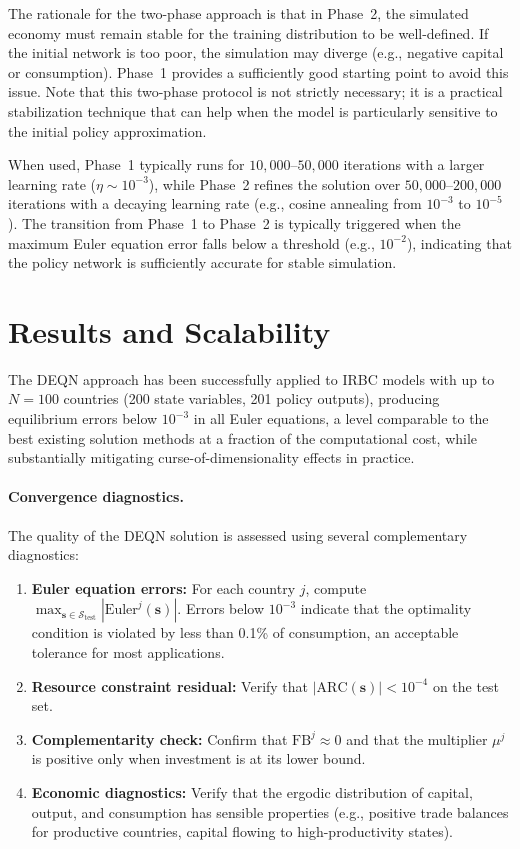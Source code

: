 \documentclass[11pt,a4paper]{report}
\begin{document}
The rationale for the two-phase approach is that in Phase~2, the simulated economy must remain stable for the training distribution to be well-defined.  If the initial network is too poor, the simulation may diverge (e.g., negative capital or consumption).  Phase~1 provides a sufficiently good starting point to avoid this issue.  Note that this two-phase protocol is not strictly necessary; it is a practical stabilization technique that can help when the model is particularly sensitive to the initial policy approximation.

When used, Phase~1 typically runs for $10{,}000$--$50{,}000$ iterations with a larger learning rate ($\eta \sim 10^{-3}$), while Phase~2 refines the solution over $50{,}000$--$200{,}000$ iterations with a decaying learning rate (e.g., cosine annealing from $10^{-3}$ to $10^{-5}$).  The transition from Phase~1 to Phase~2 is typically triggered when the maximum Euler equation error falls below a threshold (e.g., $10^{-2}$), indicating that the policy network is sufficiently accurate for stable simulation.

\section{Results and Scalability}

The DEQN approach has been successfully applied to IRBC models with up to $N=100$ countries (200 state variables, 201 policy outputs), producing equilibrium errors below $10^{-3}$ in all Euler equations, a level comparable to the best existing solution methods at a fraction of the computational cost, while substantially mitigating curse-of-dimensionality effects in practice.

\paragraph{Convergence diagnostics.}  The quality of the DEQN solution is assessed using several complementary diagnostics:
\begin{enumerate}[itemsep=2pt]
\item \textbf{Euler equation errors:} For each country $j$, compute $\max_{\bm{s} \in \mathcal{S}_\mathrm{test}} |\mathrm{Euler}^j(\bm{s})|$.  Errors below $10^{-3}$ indicate that the optimality condition is violated by less than 0.1\% of consumption, an acceptable tolerance for most applications.
\item \textbf{Resource constraint residual:} Verify that $|\mathrm{ARC}(\bm{s})| < 10^{-4}$ on the test set.
\item \textbf{Complementarity check:} Confirm that $\mathrm{FB}^j \approx 0$ and that the multiplier $\mu^j$ is positive only when investment is at its lower bound.
\item \textbf{Economic diagnostics:} Verify that the ergodic distribution of capital, output, and consumption has sensible properties (e.g., positive trade balances for productive countries, capital flowing to high-productivity states).
\end{enumerate}
\end{document}
